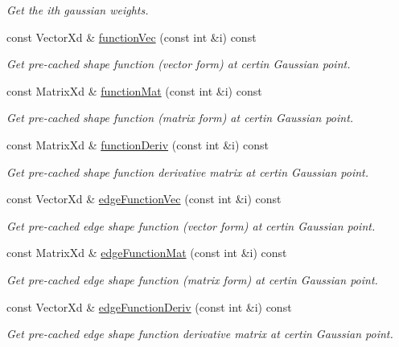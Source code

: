 \begin{DoxyCompactItemize}
\begin{DoxyCompactList}\small\item\em Get the ith gaussian weights. \end{DoxyCompactList}\item 
const Vector\+Xd \& \mbox{\hyperlink{class_shape_a69936bb268e5a1547f5e5838dde5bcdf}{function\+Vec}} (const int \&i) const
\begin{DoxyCompactList}\small\item\em Get pre-\/cached shape function (vector form) at certin Gaussian point. \end{DoxyCompactList}\item 
const Matrix\+Xd \& \mbox{\hyperlink{class_shape_a96b2b268631566142aa054211ddd9655}{function\+Mat}} (const int \&i) const
\begin{DoxyCompactList}\small\item\em Get pre-\/cached shape function (matrix form) at certin Gaussian point. \end{DoxyCompactList}\item 
const Matrix\+Xd \& \mbox{\hyperlink{class_shape_abb3d4512095e82bcaf821385e1952336}{function\+Deriv}} (const int \&i) const
\begin{DoxyCompactList}\small\item\em Get pre-\/cached shape function derivative matrix at certin Gaussian point. \end{DoxyCompactList}\item 
const Vector\+Xd \& \mbox{\hyperlink{class_shape_a1d79b0ac86d547e06121eec43cbdea2b}{edge\+Function\+Vec}} (const int \&i) const
\begin{DoxyCompactList}\small\item\em Get pre-\/cached edge shape function (vector form) at certin Gaussian point. \end{DoxyCompactList}\item 
const Matrix\+Xd \& \mbox{\hyperlink{class_shape_a5d6e400458f3381b3adeeac34839e401}{edge\+Function\+Mat}} (const int \&i) const
\begin{DoxyCompactList}\small\item\em Get pre-\/cached edge shape function (matrix form) at certin Gaussian point. \end{DoxyCompactList}\item 
const Vector\+Xd \& \mbox{\hyperlink{class_shape_adb82ef67f86561caa0cebdb4abb7342a}{edge\+Function\+Deriv}} (const int \&i) const
\begin{DoxyCompactList}\small\item\em Get pre-\/cached edge shape function derivative matrix at certin Gaussian point. \end{DoxyCompactList}\item 

\end{DoxyCompactItemize}
